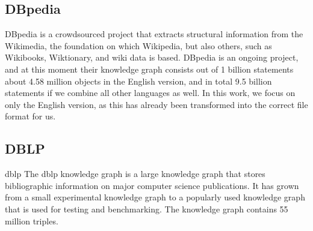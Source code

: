 \documentclass[11pt,letterpaper ,oneside ]{book}
\begin{document}
	\subsection{DBpedia}
	DBpedia\cite{DBpedia} is a crowdsourced project that extracts structural information from the Wikimedia, the foundation on which Wikipedia, but also others, such as Wikibooks, Wiktionary, and wiki data is based. DBpedia is an ongoing project, and at this moment their knowledge graph consists out of 1 billion statements about 4.58 million objects in the English version, and in total 9.5 billion statements if we combine all other languages as well. In this work, we focus on only the English version, as this has already been transformed into the correct file format for us. 
	\begin{figure}[!t]
\end{figure}

	\subsection{DBLP}
	dblp\cite{DBLP} The dblp knowledge graph is a large knowledge graph that stores bibliographic information on major computer science publications. It has grown from a small experimental knowledge graph to a popularly used knowledge graph that is used for testing and benchmarking. The knowledge graph contains 55 million triples.
	
\end{document}
